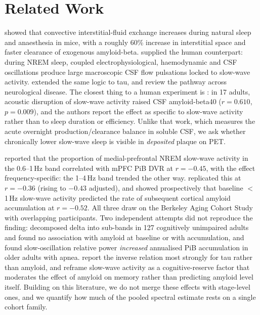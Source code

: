 \section{Related Work}
\label{sec:related}

 \citet{xie2013} showed that convective
interstitial-fluid exchange increases during natural sleep and anaesthesia in mice, with a
roughly 60\% increase in interstitial space and faster clearance of exogenous amyloid-beta.
\citet{fultz2019} supplied the human counterpart: during NREM sleep, coupled
electrophysiological, haemodynamic and CSF oscillations produce large macroscopic CSF flow
pulsations locked to slow-wave activity. \citet{holth2019} extended the same logic to tau, and
\citet{rasmussen2018} review the pathway across neurological disease. The closest thing to a
human experiment is \citet{ju2017}: in 17 adults, acoustic disruption of slow-wave activity
raised CSF amyloid-beta40 ($r = 0.610$, $p = 0.009$), and the authors report the effect as
specific to slow-wave activity rather than to sleep duration or efficiency. Unlike that work,
which measures the acute overnight production/clearance balance in soluble CSF, we ask whether
chronically lower slow-wave sleep is visible in \emph{deposited} plaque on PET.

 \citet{mander2015} reported that the proportion
of medial-prefrontal NREM slow-wave activity in the 0.6--1\,Hz band correlated with mPFC PiB DVR
at $r = -0.45$, with the effect frequency-specific: the 1--4\,Hz band trended the other way.
\citet{winer2019} replicated this at $r = -0.36$ (rising to $-0.43$ adjusted), and
\citet{winer2020} showed prospectively that baseline $<$1\,Hz slow-wave activity predicted the
rate of subsequent cortical amyloid accumulation at $r = -0.52$. All three draw on the Berkeley
Aging Cohort Study with overlapping participants. Two independent attempts did not reproduce
the finding: \citet{champetier2024} decomposed delta into sub-bands in 127 cognitively
unimpaired adults and found no association with amyloid at baseline or with accumulation, and
\citet{carvalho2024} found slow-oscillation relative power \emph{increased} annualised PiB
accumulation in older adults with apnea. \citet{lucey2019} report the inverse relation most
strongly for tau rather than amyloid, and \citet{zavecz2023} reframe slow-wave activity as a
cognitive-reserve factor that moderates the effect of amyloid on memory rather than predicting
amyloid level itself. Building on this literature, we do not merge these
effects with stage-level ones, and we quantify how much of the pooled spectral estimate rests
on a single cohort family.

